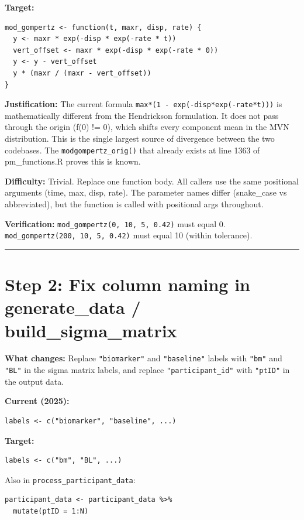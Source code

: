 \documentclass[11pt]{article}
\begin{document}
\textbf{Target:}
\begin{lstlisting}
mod_gompertz <- function(t, maxr, disp, rate) {
  y <- maxr * exp(-disp * exp(-rate * t))
  vert_offset <- maxr * exp(-disp * exp(-rate * 0))
  y <- y - vert_offset
  y * (maxr / (maxr - vert_offset))
}
\end{lstlisting}

\textbf{Justification:} The current formula \texttt{max*(1 - exp(-disp*exp(-rate*t)))}
is mathematically different from the Hendrickson formulation. It does
not pass through the origin (f(0) != 0), which shifts every component
mean in the MVN distribution. This is the single largest source of
divergence between the two codebases. The \texttt{modgompertz\_orig()} that
already exists at line 1363 of pm\_functions.R proves this is known.

\textbf{Difficulty:} Trivial. Replace one function body. All callers use
the same positional arguments (time, max, disp, rate). The parameter
names differ (snake\_case vs abbreviated), but the function is called
with positional args throughout.

\textbf{Verification:} \texttt{mod\_gompertz(0, 10, 5, 0.42)} must equal 0.
\texttt{mod\_gompertz(200, 10, 5, 0.42)} must equal 10 (within tolerance).

\bigskip\noindent\rule{\textwidth}{0.4pt}\bigskip

\section{Step 2: Fix column naming in generate\_data / build\_sigma\_matrix}

\textbf{What changes:} Replace \texttt{"biomarker"} and \texttt{"baseline"} labels
with \texttt{"bm"} and \texttt{"BL"} in the sigma matrix labels, and replace
\texttt{"participant\_id"} with \texttt{"ptID"} in the output data.

\textbf{Current (2025):}
\begin{lstlisting}
labels <- c("biomarker", "baseline", ...)
\end{lstlisting}

\textbf{Target:}
\begin{lstlisting}
labels <- c("bm", "BL", ...)
\end{lstlisting}

Also in \texttt{process\_participant\_data}:
\begin{lstlisting}
participant_data <- participant_data %>%
  mutate(ptID = 1:N)
\end{lstlisting}
\end{document}

